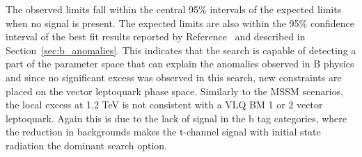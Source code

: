 The observed limits fall within the central 95\% intervals of the expected limits when no signal is present. 
The expected limits are also within the 95\% confidence interval of the best fit results reported by Reference~\cite{Cornella:2021sby} and described in Section~\ref{sec:b_anomalies}.
This indicates that the search is capable of detecting a part of the parameter space that can explain the anomalies observed in B physics and since no significant excess was observed in this search, new constraints are placed on the vector leptoquark phase space.
Similarly to the \ac{MSSM} scenarios, the local excess at 1.2 TeV is not consistent with a VLQ BM 1 or 2 vector leptoquark.
Again this is due to the lack of signal in the b tag categories, where the reduction in backgrounds makes the t-channel signal with initial state radiation the dominant search option.


